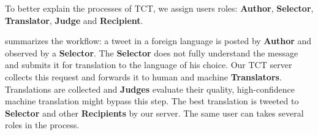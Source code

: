 \documentclass[11pt]{article}
\begin{document}
To better explain the processes of TCT, we assign users roles: 
\textbf{Author}, \textbf{Selector}, \textbf{Translator}, \textbf{Judge} 
and \textbf{Recipient}.

 summarizes the workflow: a tweet in a foreign language is
posted by \textbf{Author} and observed by a \textbf{Selector}. 
The \textbf{Selector} does not fully understand the message 
and submits it for translation to the language of his choice. 
Our TCT server collects this request and
forwards it to human and machine \textbf{Translators}. Translations 
are collected and \textbf{Judges} evaluate their quality, high-confidence
machine translation might bypass this step. The best
translation is tweeted to \textbf{Selector} and other \textbf{Recipients} 
by our server. 
The same user can takes several roles in the process. 
\end{document}
